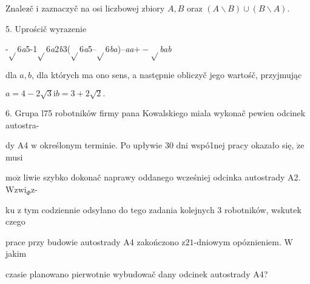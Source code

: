\documentclass[a4paper,12pt]{article}
\begin{document}
Znalez$\acute{}$č $\mathrm{i}$ zaznaczyč na osi liczbowej zbiory $A, B$ oraz $(A\backslash B)\cup(B\backslash A).$

5. Uprościč wyrazenie

-$\sqrt{}$6{\it a}5-1$\sqrt{}$6{\it a}2{\it b}3($\sqrt{}$6{\it a}5--$\sqrt{}$6{\it ba})--{\it aa}$+-\sqrt{}${\it bab}

dla $a, b$, dla których ma ono sens, a następnie obliczyč jego wartośč, przyjmując

$a=4-2\sqrt{3}\mathrm{i} b=3+2\sqrt{2}.$

6. Grupa l75 robotników firmy pana Kowalskiego miala wykonač pewien odcinek autostra-

dy A4 $\mathrm{w}$ określonym terminie. Po upływie 30 dni wspó1nej pracy okazało się, $\dot{\mathrm{z}}\mathrm{e}$ musi

$\mathrm{m}\mathrm{o}\dot{\mathrm{z}}$ liwie szybko dokonač naprawy oddanego wcześniej odcinka autostrady A2. $\mathrm{W}\mathrm{z}\mathrm{w}\mathrm{i}_{\Phi}\mathrm{z}$-

ku $\mathrm{z}$ tym codziennie odsyłano do tego zadania kolejnych 3 robotników, wskutek czego

prace przy budowie autostrady A4 zakończono $\mathrm{z} 21$-dniowym opóznieniem. $\mathrm{W}$ jakim

czasie planowano pierwotnie wybudowač dany odcinek autostrady A4?
\end{document}
